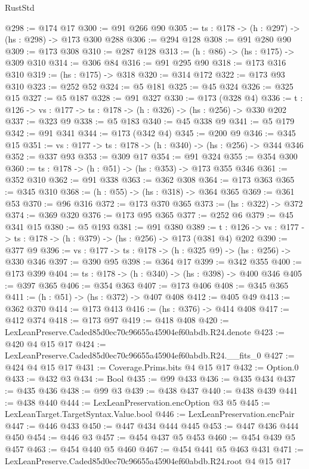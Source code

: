 \begin{lexlean}{RustStd}
\begin{coremodule}
@298 := @174 @17
@300 := @91 @266 @90
@305 := {ts : @178} -> (h : @297) -> (hs : @298) -> @173 @300 @288
@306 := @294 @128
@308 := @91 @280 @90
@309 := @173 @308
@310 := @287 @128
@313 := (h : @86) -> (hs : @175) -> @309 @310
@314 := @306 @84
@316 := @91 @295 @90
@318 := @173 @316 @310
@319 := (hs : @175) -> @318
@320 := @314 @172
@322 := @173 @93 @310
@323 := @252 @52
@324 := @5 @181
@325 := @45 @324
@326 := @325 @15
@327 := @5 @187
@328 := @91 @327
@330 := @173 (@328 @4)
@336 := {t : @126} -> {vs : @177} -> {ts : @178} -> (h : @326) -> (hs : @256) -> @330 @202
@337 := @323 @9
@338 := @5 @183
@340 := @45 @338 @9
@341 := @5 @179
@342 := @91 @341
@344 := @173 (@342 @4)
@345 := @200 @9
@346 := @345 @15
@351 := {vs : @177} -> {ts : @178} -> (h : @340) -> (hs : @256) -> @344 @346
@352 := @337 @93
@353 := @309 @17
@354 := @91 @324
@355 := @354 @300
@360 := {ts : @178} -> (h : @51) -> (hs : @353) -> @173 @355 @346
@361 := @352 @310
@362 := @91 @338
@363 := @362 @308
@364 := @173 @363
@365 := @345 @310
@368 := (h : @55) -> (hs : @318) -> @364 @365
@369 := @361 @53
@370 := @96 @316
@372 := @173 @370 @365
@373 := (hs : @322) -> @372
@374 := @369 @320
@376 := @173 @95 @365
@377 := @252 @6
@379 := @45 @341 @15
@380 := @5 @193
@381 := @91 @380
@389 := {t : @126} -> {vs : @177} -> {ts : @178} -> (h : @379) -> (hs : @256) -> @173 (@381 @4) @202
@390 := @377 @9
@396 := {vs : @177} -> {ts : @178} -> (h : @325 @9) -> (hs : @256) -> @330 @346
@397 := @390 @95
@398 := @364 @17
@399 := @342 @355
@400 := @173 @399
@404 := {ts : @178} -> (h : @340) -> (hs : @398) -> @400 @346
@405 := @397 @365
@406 := @354 @363
@407 := @173 @406
@408 := @345 @365
@411 := (h : @51) -> (hs : @372) -> @407 @408
@412 := @405 @49
@413 := @362 @370
@414 := @173 @413
@416 := (hs : @376) -> @414 @408
@417 := @412 @374
@418 := @173 @97
@419 := @418 @408
@420 := LexLeanPreserve.Caded85d0ec70c96655a45904ef60abdb.R24.denote
@423 := @420 @4 @15 @17
@424 := LexLeanPreserve.Caded85d0ec70c96655a45904ef60abdb.R24.__fits_0
@427 := @424 @4 @15 @17
@431 := Coverage.Prims.bits @4 @15 @17
@432 := Option.{0}
@433 := @432 @3
@434 := Bool
@435 := @99 @433
@436 := @435 @434
@437 := @435 @436
@438 := @99 @3
@439 := @438 @437
@440 := @438 @439
@441 := @438 @440
@444 := LexLeanPreservation.encOption @3 @5
@445 := LexLeanTarget.TargetSyntax.Value.bool
@446 := LexLeanPreservation.encPair
@447 := @446 @433
@450 := @447 @434 @444 @445
@453 := @447 @436 @444 @450
@454 := @446 @3
@457 := @454 @437 @5 @453
@460 := @454 @439 @5 @457
@463 := @454 @440 @5 @460
@467 := @454 @441 @5 @463 @431
@471 := LexLeanPreserve.Caded85d0ec70c96655a45904ef60abdb.R24.root @4 @15 @17

\end{coremodule}
\end{lexlean}
